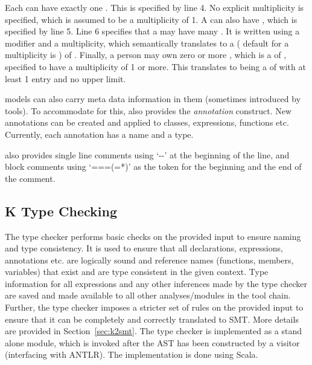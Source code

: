 Each  can have exactly one . This is
specified by line 4. No explicit multiplicity is specified, which is
assumed to be a multiplicity of 1. A  can also have
, which is specified by line 5. Line 6 specifies that a
 may have many . It is written using a
modifier and a multiplicity, which semantically translates to a
 (\Klang{} default for a multiplicity is ) of
. Finally, a person may own zero or more
, which is a  of , specified to
have a multiplicity of 1 or more. This translates to 
being a  of  with at least 1 entry and no
upper limit.

\sysml{} models can also carry meta data information in them
(sometimes introduced by tools). To accommodate for this, \Klang{}
also provides the {\em annotation} construct. New annotations can be
created and applied to classes, expressions, functions etc. Currently,
each annotation has a name and a type.

\Klang{} also provides single line comments using `-{}-' at the
beginning of the line, and block comments using `===(=*)' as the token for
the beginning and the end of the comment.

\subsection{K Type Checking}

The \Klang{} type checker performs basic checks on the provided input
to ensure naming and type consistency. It is used to ensure that all
declarations, expressions, annotations etc. are logically sound and
reference names (functions, members, variables) that exist and are
type consistent in the given context. Type information for all
expressions and any other inferences made by the type checker are
saved and made available to all other analyses/modules in the \Klang{}
tool chain. Further, the type checker imposes a stricter set of rules
on the provided input to ensure that it can be completely and
correctly translated to SMT. More details are provided in
Section~\ref{sec:k2smt}. The type checker is implemented as a stand
alone module, which is invoked after the AST has been constructed by a
visitor (interfacing with ANTLR). The implementation is done using
Scala.

